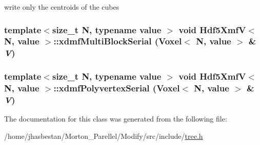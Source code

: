 \label{classHdf5XmfV_a59e1e8befe19492a44253a6e2a88dbf4}
write only the centroids of the cubes \hypertarget{classHdf5XmfV_a303a20a8b00db8f318e86e3619d8d206}{
\subsubsection[{xdmfMultiBlockSerial}]{\setlength{\rightskip}{0pt plus 5cm}template$<$size\_\-t N, typename value $>$ void {\bf Hdf5XmfV}$<$ N, value $>$::xdmfMultiBlockSerial ({\bf Voxel}$<$ N, value $>$ \& {\em V})}}
\label{classHdf5XmfV_a303a20a8b00db8f318e86e3619d8d206}
\hypertarget{classHdf5XmfV_aa628576f1c167b9ae740b35fe820ccb9}{
\subsubsection[{xdmfPolyvertexSerial}]{\setlength{\rightskip}{0pt plus 5cm}template$<$size\_\-t N, typename value $>$ void {\bf Hdf5XmfV}$<$ N, value $>$::xdmfPolyvertexSerial ({\bf Voxel}$<$ N, value $>$ \& {\em V})}}
\label{classHdf5XmfV_aa628576f1c167b9ae740b35fe820ccb9}


The documentation for this class was generated from the following file:\begin{DoxyCompactItemize}
\item 
/home/jhasbestan/Morton\_\-Parellel/Modify/src/include/\hyperlink{tree_8h}{tree.h}\end{DoxyCompactItemize}
